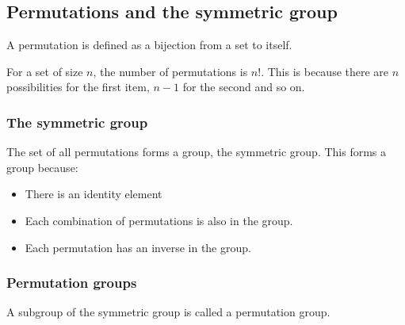 
\subsection{Permutations and the symmetric group}

A permutation is defined as a bijection from a set to itself.

For a set of size \(n\), the number of permutations is \(n!\). This is because there are \(n\) possibilities for the first item, \(n-1\) for the second and so on.

\subsubsection{The symmetric group}

The set of all permutations forms a group, the symmetric group. This forms a group because:

\begin{itemize}
\item There is an identity element
\item Each combination of permutations is also in the group.
\item Each permutation has an inverse in the group.
\end{itemize}

\subsubsection{Permutation groups}

A subgroup of the symmetric group is called a permutation group.


